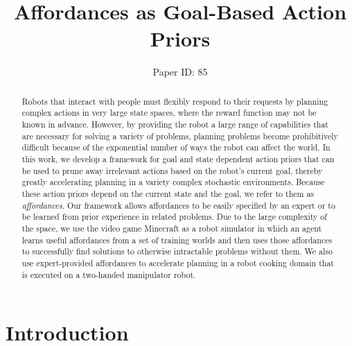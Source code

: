 \documentclass[letterpaper]{article}
\begin{document}
\title{Affordances as Goal-Based Action Priors}


\author{Paper ID: 85}

\maketitle

\begin{abstract}
Robots that interact with people must flexibly respond to their
requests by planning complex actions in very large state spaces, where
the reward function may not be known in advance.  However, by
providing the robot a large range of capabilities that are necessary
for solving a variety of problems, planning problems become
prohibitively difficult because of the exponential number of ways the
robot can affect the world.  In this work, we develop a framework for
goal and state dependent action priors that can be used to prune away
irrelevant actions based on the robot's current goal, thereby greatly
accelerating planning in a variety complex stochastic environments.
Because these action priors depend on the current state and the goal,
we refer to them as {\em affordances}.  Our framework allows
affordances to be easily specified by an expert or to be learned from
prior experience in related problems. Due to the large complexity of
the space, we use the video game Minecraft as a robot simulator in
which an agent learns useful affordances from a set of training
worlds and then uses those affordances to successfully find solutions to
otherwise intractable problems without them. We also use
expert-provided affordances to accelerate planning in a robot cooking
domain that is executed on a two-handed manipulator robot.
\end{abstract}


\section{Introduction}
\label{sec:introduction}
\end{document}

